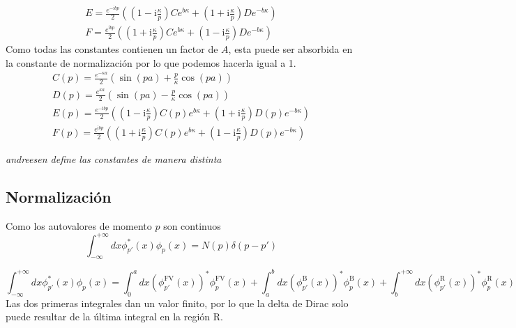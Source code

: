 \documentclass[11pt,a4paper]{article}
\newcommand{\I}{\text{i}}
\begin{document}
\begin{gather}
    E = \frac{e^{-\I bp}}{2}\left(\left(1 - \I \frac{\kappa}{p}\right)Ce^{b\kappa} + \left(1 + \I \frac{\kappa}{p}\right)De^{-b\kappa}\right)\\
    F = \frac{e^{\I bp}}{2}\left(\left(1 + \I \frac{\kappa}{p}\right)Ce^{b\kappa} + \left(1 - \I \frac{\kappa}{p}\right)De^{-b\kappa}\right)
\end{gather}
Como todas las constantes contienen un factor de $A$, esta puede ser absorbida en la constante de normalización por lo que podemos hacerla igual a 1.
\begin{gather}
	C\left(p\right) = \frac{e^{-\kappa a}}{2}\left(\sin\left(pa\right) + \frac{p}{\kappa} \cos\left(pa\right)\right)\\
	D\left(p\right)  = \frac{e^{\kappa a}}{2}\left(\sin\left(pa\right) - \frac{p}{\kappa} \cos\left(pa\right) \right) \\
	E\left(p\right)  = \frac{e^{-\I bp}}{2}\left(\left(1 - \I \frac{\kappa}{p}\right)C(p)e^{b\kappa} + \left(1 + \I \frac{\kappa}{p}\right)D(p)e^{-b\kappa}\right)\\
	F\left(p\right)  = \frac{e^{\I bp}}{2}\left(\left(1 + \I \frac{\kappa}{p}\right)C(p)e^{b\kappa} + \left(1 - \I \frac{\kappa}{p}\right)D(p)e^{-b\kappa}\right)
\end{gather}

\emph{andreesen define las constantes de manera distinta}

\subsection{Normalización}
Como los autovalores de momento $p$ son continuos
\begin{equation}
	\int_{-\infty}^{+\infty} dx \phi^{*}_{p'}(x) \phi_p(x) = N\left(p\right) \delta(p-p')
\end{equation}

\begin{equation}
\int_{-\infty}^{+\infty} dx \phi^{*}_{p'}(x) \phi_p(x) = \int_0^a dx \left( \phi^{\text{FV}}_{p'}(x) \right)^* \phi_p^{\text{FV}}(x) + \int_a^b dx \left( \phi^{\text{B}}_{p'}(x) \right)^* \phi_p^{\text{B}}(x) + \int_b^{+\infty} dx \left( \phi^{\text{R}}_{p'}(x) \right)^* \phi^{\text{R}}_p(x) 
\end{equation}
Las dos primeras integrales dan un valor finito, por lo que la delta de Dirac solo puede resultar de la última integral en la región R.
\end{document}
